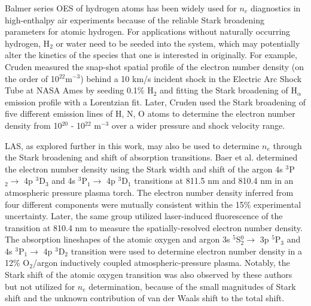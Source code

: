 \documentclass[12pt]{iopart}
\begin{document}
Balmer series OES of hydrogen atoms\cite{Laux2003,Lemal2016,grinstead2008,cruden2009, cruden2012} has been widely used for $n_e$ diagnostics in high-enthalpy air experiments because of the reliable Stark broadening parameters for atomic hydrogen. For applications without naturally occurring hydrogen, H$_2$ or water need to be seeded into the system, which may potentially alter the kinetics of the  species that one is interested in originally. For example, Cruden\cite{cruden2009} measured the snap-shot spatial profile of the electron number density (on the order of 10$^{22}$m$^{-3}$) behind a 10 km/s incident shock in the Electric Arc Shock Tube at NASA Ames by seeding 0.1\% H$_2$ and fitting the Stark broadening of H$_{\alpha}$ emission profile with a Lorentzian fit. Later, Cruden\cite{cruden2012} used the Stark broadening of five different emission lines of H, N, O atoms to determine the electron number density from 10$^{20}$ - 10$^{22}$ m$^{-3}$ over a wider pressure and shock velocity range.  

LAS, as explored further in this work, may also be used to determine $n_e$ through the Stark broadening and shift of absorption transitions\cite{Baer1992c,baer1992d,Baer1993_semiconductor,Konjevic1999}. Baer et al. determined the electron number density using the Stark width and shift of the argon 4s $^3 $P$_2\rightarrow$ 4p $^3$D$_3$ and 4s $^3 $P$_1\rightarrow$ 4p $^3$D$_1$ transitions  at 811.5 nm and 810.4 nm in an atmospheric pressure plasma torch\cite{Baer1992c}. The electron number density inferred from four different components were mutually consistent within the 15\% experimental uncertainty. Later, the same group utilized laser-induced fluorescence of the transition at 810.4 nm  to measure the spatially-resolved electron number density\cite{baer1992d}. The absorption lineshapes of the atomic oxygen and argon 3s $^5 $S$_2^0\rightarrow$ 3p $^5$P$_3$ and 4s $^3 $P$_1\rightarrow$ 4p $^3$D$_2$ transition were used to determine electron number density in a 12\% O$_2$/argon inductively coupled atmospheric-pressure plasma\cite{Baer1993_semiconductor}. Notably, the Stark shift of the atomic oxygen transition was also observed by these authors but not utilized for $n_e$ determination, because of the small magnitudes of Stark shift and the unknown contribution of van der Waals shift to the total shift.
\end{document}
